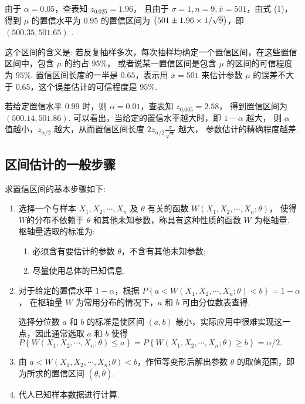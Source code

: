 由于 $ \alpha=0.05$，查表知 $ z_{0.025}=1.96$，
且由于 $ \sigma=1, n=9, \bar{x}=501 $，由式 (1)，
得到 $ \mu $ 的置信水平为 $0.95$ 的置信区间为 $\qty(501 \pm 1.96 \times 1 / \sqrt{9}) $，即  $(500.35,501.65)$ .

这个区间的含义是: 若反复抽样多次，每次抽样均确定一个置信区间，在这些置信区间中，包含 $ \mu $ 的约占 $ 95 \% $，
或者说某一置信区间是包含 $ \mu $ 的区间的可信程度为 $ 95 \% $.
置信区间长度的一半是 $0.65$，表示用 $ \bar{x}=501 $ 来估计参数 $ \mu $ 的误差不大于 $0.65$，这个误差估计的可信程度是 $ 95 \% .$

若给定置信水平 $0.99$ 时，则 $ \alpha=0.01$，查表知 $ z_{0.005}=2.58$，
得到置信区间为 $ (500.14 , 501. 86)$. 可以看出，当给定的置信水平越大时，即 $ 1-\alpha $ 越大，
则 $ \alpha $ 值越小，$z_{\alpha / 2} $ 越大，从而置信区间长度 $\displaystyle 2 z_{\alpha / 2} \frac{\sigma}{\sqrt{n}} $ 越大，
参数估计的精确程度越差.

\subsection{区间估计的一般步骤}

求置信区间的基本步骤如下:
\begin{enumerate}[label=(\arabic{*})]
    \item 选择一个与样本 $ X_{1}, X_{2}, \cdots, X_{n} $ 及 $ \theta $ 有关的函数 $ W\left(X_{1}, X_{2}, \cdots, X_{n} ; \theta\right) $，
          使得 $ W $的分布不依赖于 $ \theta $ 和其他未知参数，称具有这种性质的函数 $ W $ 为枢轴量.
          枢轴量选取的标准为:
          \begin{enumerate}
              \item 必须含有要估计的参数 $ \theta $，不含有其他未知参数;
              \item 尽量使用总体的已知信息.
          \end{enumerate}
    \item 对于给定的置信水平 $ 1-\alpha$，根据 $\displaystyle P\left\{a<W\left(X_{1}, X_{2}, \cdots, X_{n} ; \theta\right)<b\right\}=1-\alpha $，
          在枢轴量 $ W $ 为常用分布的情况下，$a$ 和 $ b $ 可由分位数表查得.

          选择分位数 $ a $ 和 $ b $ 的标准是使区间 $ (a, b) $ 最小，实际应用中很难实现这一点，因此通常选取 $ a $ 和 $ b $ 使得
          $\displaystyle P\left\{W\left(X_{1}, X_{2}, \cdots, X_{n} ; \theta\right) \leqslant a\right\}=P\left\{W\left(X_{1}, X_{2}, \cdots, X_{n} ; \theta\right) \geqslant b\right\}=\alpha / 2 .$
    \item 由 $ a<W\left(X_{1}, X_{2}, \cdots, X_{n} ; \theta\right)<b$，作恒等变形后解出参数 $ \theta $ 的取值范围，即为所求的置信区间 $ (\underline{\theta}, \bar{\theta}) $.
    \item 代人已知样本数据进行计算.
\end{enumerate}
